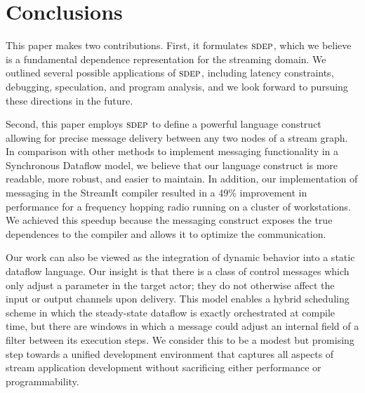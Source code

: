 \section{Conclusions}

This paper makes two contributions.  First, it formulates $\textsc{sdep}$,
which we believe is a fundamental dependence representation for the
streaming domain.  We outlined several possible applications of
$\textsc{sdep}$, including latency constraints, debugging, speculation, and
program analysis, and we look forward to pursuing these directions in
the future.

Second, this paper employs $\textsc{sdep}$ to define a powerful language
construct allowing for precise message delivery between any two nodes
of a stream graph.  In comparison with other methods to implement
messaging functionality in a Synchronous Dataflow model, we believe
that our language construct is more readable, more robust, and easier
to maintain.  In addition, our implementation of messaging in the
StreamIt compiler resulted in a 49\% improvement in performance for a
frequency hopping radio running on a cluster of workstations.  We
achieved this speedup because the messaging construct exposes the true
dependences to the compiler and allows it to optimize the
communication.

Our work can also be viewed as the integration of dynamic behavior
into a static dataflow language.  Our insight is that there is a class
of control messages which only adjust a parameter in the target actor;
they do not otherwise affect the input or output channels upon
delivery.  This model enables a hybrid scheduling scheme in which the
steady-state dataflow is exactly orchestrated at compile time, but
there are windows in which a message could adjust an internal field of
a filter between its execution steps.  We consider this to be a modest
but promising step towards a unified development environment that
captures all aspects of stream application development without
sacrificing either performance or programmability.
